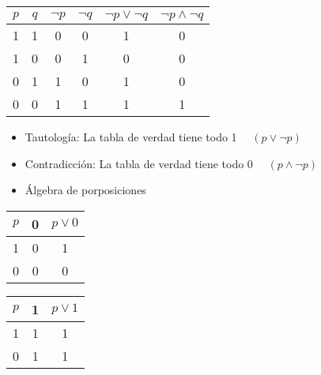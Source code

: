 \documentclass[12pt]{article}
\begin{document}
\begin{tabular}{|c|c|c|c|c|c|}
	\hline
	\rowcolor{lightblue!50}
	\hline
	$p$ & $q$ & $\neg p$ & $\neg q$ & $\neg p\vee \neg q$ & $\neg p\wedge \neg q$ \\ \hline
	1   & 1   & 0        & 0        & 1                   & 0                     \\ \hline
	1   & 0   & 0        & 1        & 0                   & 0                     \\ \hline
	0   & 1   & 1        & 0        & 1                   & 0                     \\ \hline
	0   & 0   & 1        & 1        & 1                   & 1                     \\ \hline
\end{tabular}
\begin{itemize}[label=\color{red}\textbullet]
	\item {\color{lightblue} Tautología: } La tabla de verdad tiene todo 1 $\quad(p\vee\neg p)$
	\item {\color{lightblue} Contradicción: } La tabla de verdad tiene todo 0 $\quad(p\wedge\neg p)$
\end{itemize}
\begin{itemize}[label=\color{red}\textbullet, leftmargin=*]
	\item \color{lightblue} Álgebra de porposiciones
\end{itemize}

\begin{tabular}{|c|c|c|}
	\hline
	\rowcolor{lightblue!50}
	\hline
	$p$ & 0 & $p\vee0$ \\ \hline
	1   & 0 & 1        \\ \hline
	0   & 0 & 0        \\ \hline
\end{tabular}\qquad\begin{tabular}{|c|c|c|}
\hline
\rowcolor{lightblue!50}
\hline
$p$ & 1 & $p\vee1$ \\ \hline
1   & 1 & 1        \\ \hline
0   & 1 & 1        \\ \hline
\end{tabular}
\end{document}
